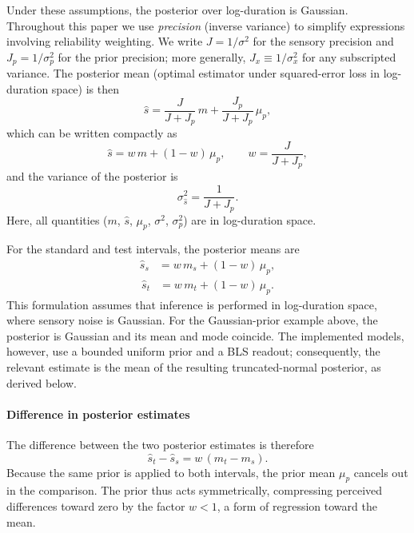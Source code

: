 \documentclass{biorxiv}
\begin{document}
Under these assumptions, the posterior over log-duration is Gaussian. Throughout this paper we use \emph{precision} (inverse variance) to simplify expressions involving reliability weighting.  We write $J = 1/\sigma^2$ for the sensory precision and $J_p = 1/\sigma_p^2$ for the prior precision; more generally, $J_x \equiv 1/\sigma_x^2$ for any subscripted variance. The posterior mean (optimal estimator under squared-error loss in log-duration space) is then
\begin{equation}
\hat{s}
=
\frac{J}{J + J_p} \, m
+
\frac{J_p}{J + J_p} \, \mu_p,
\label{eq:posterior_mean}
\end{equation}
which can be written compactly as
\begin{equation}
\hat{s}
=
w\, m + (1-w)\,\mu_p,
\qquad
w = \frac{J}{J + J_p},
\label{eq:posterior_weight}
\end{equation}
and the variance of the posterior is
\begin{equation}
\sigma_{\hat{s}}^2 = \frac{1}{J + J_p}.
\label{eq:posterior_var}
\end{equation}
Here, all quantities ($m$, $\hat{s}$, $\mu_p$, $\sigma^2$, $\sigma_p^2$) are in log-duration space.

For the standard and test intervals, the posterior means are
\begin{align}
\hat{s}_s &= w\, m_s + (1-w)\,\mu_p,
\label{eq:posterior_standard} 
\end{align}
\begin{align}
\hat{s}_t &= w\, m_t + (1-w)\,\mu_p.
\label{eq:posterior_test}
\end{align}
This formulation assumes that inference is performed in log-duration space, where sensory noise is Gaussian. For the Gaussian-prior example above, the posterior is Gaussian and its mean and mode coincide. The implemented models, however, use a bounded uniform prior and a BLS readout; consequently, the relevant estimate is the mean of the resulting truncated-normal posterior, as derived below.

\paragraph{Difference in posterior estimates}

The difference between the two posterior estimates is therefore
\begin{equation}
\hat{s}_t - \hat{s}_s
=
w\,(m_t - m_s).
\label{eq:posterior_difference}
\end{equation}
Because the same prior is applied to both intervals, the prior mean $\mu_p$ cancels out in the comparison. The prior thus acts symmetrically, compressing perceived differences toward zero by the factor $w < 1$, a form of regression toward the mean.
\end{document}

